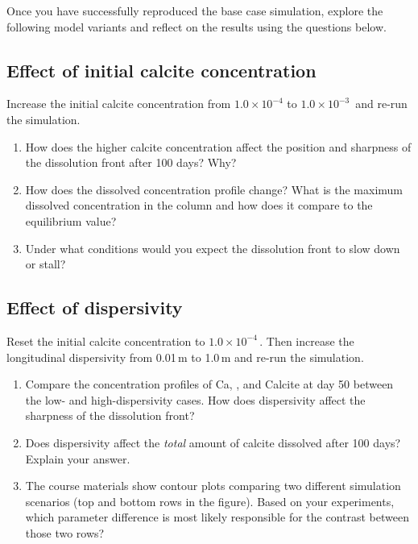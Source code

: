 Once you have successfully reproduced the base case simulation, explore
the following model variants and reflect on the results using the
questions below.

\subsection{Effect of initial calcite concentration}

Increase the initial calcite concentration from $1.0 \times 10^{-4}$
to $1.0 \times 10^{-3}$\,\molvol{} and re-run the simulation.

\begin{enumerate}

\item How does the higher calcite concentration affect the position and
  sharpness of the dissolution front after 100 days?  Why?

\item How does the dissolved  concentration profile change?
  What is the maximum dissolved  concentration in the column
  and how does it compare to the equilibrium value?

\item Under what conditions would you expect the dissolution front to
  slow down or stall?

\end{enumerate}

\subsection{Effect of dispersivity}

Reset the initial calcite concentration to $1.0 \times 10^{-4}$\,\molvol.
Then increase the longitudinal dispersivity from 0.01\,m to 1.0\,m and
re-run the simulation.

\begin{enumerate}

\item Compare the concentration profiles of Ca, , and Calcite
  at day 50 between the low- and high-dispersivity cases.  How does
  dispersivity affect the sharpness of the dissolution front?

\item Does dispersivity affect the \emph{total} amount of calcite
  dissolved after 100 days?  Explain your answer.

\item The course materials show contour plots comparing two different
  simulation scenarios (top and bottom rows in the figure).  Based on
  your experiments, which parameter difference is most likely
  responsible for the contrast between those two rows?

\end{enumerate}


